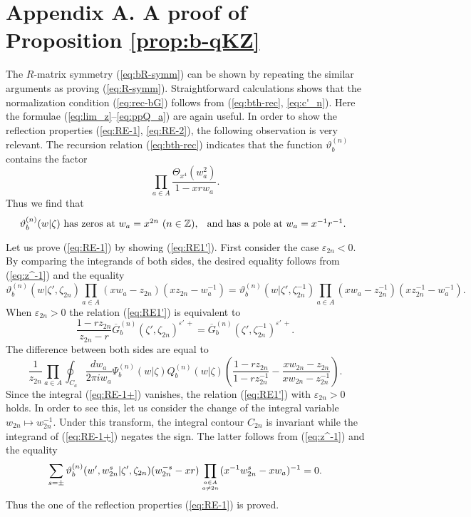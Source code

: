 \documentclass[a4paper,10pt]{article}
\begin{document}
{\appendix

\section{Appendix A. A proof of Proposition 
\ref{prop:b-qKZ}}

The $R$-matrix symmetry (\ref{eq:bR-symm}) can be 
shown by repeating the similar arguments as proving 
(\ref{eq:R-symm}). Straightforward calculations shows 
that the normalization condition (\ref{eq:rec-bG}) 
follows from (\ref{eq:bth-rec}, \ref{eq:c'_n}). 
Here the formulae (\ref{eq:lim_z}--\ref{eq:ppQ_a}) 
are again useful. In order to show the reflection 
properties (\ref{eq:RE-1}, \ref{eq:RE-2}), the following 
observation is very relevant. 
The recursion relation (\ref{eq:bth-rec}) indicates 
that the function $\vartheta^{(n)}_b$ contains the 
factor 
$$
\prod_{a\in A} \frac{\Theta_{x^4} (w_a^{2})}{1-xrw_a}. 
$$
Thus we find that 
\begin{equation}
\mbox{$\vartheta^{(n)}_b(w|\zeta )$ has zeros at $w_a =
x^{2n}$ ($n\in\mathbb{Z}$), \; and has a pole at 
$w_a =x^{-1}r^{-1}$. }
\label{eq:bth-0pole}
\end{equation}

Let us prove (\ref{eq:RE-1}) by showing (\ref{eq:RE1'}). 
First consider the case $\varepsilon_{2n}<0$. By comparing 
the integrands of both sides, the desired equality follows 
from (\ref{eq:z^-1}) and the equality 
$$
\vartheta^{(n)}_b(w|\zeta', \zeta_{2n})\prod_{a\in A} 
(xw_a -z_{2n})(xz_{2n}-w_a^{-1})=
\vartheta^{(n)}_b(w|\zeta', \zeta_{2n}^{-1})\prod_{a\in A} 
(xw_a -z_{2n}^{-1})(xz_{2n}^{-1}-w_a^{-1}). 
$$
When $\varepsilon_{2n}>0$ the relation (\ref{eq:RE1'}) 
is equivalent to 
$$
\frac{1-rz_{2n}}{z_{2n}-r}
\overline{G}_{b}^{(n)} (\zeta', \zeta_{2n})^{
\varepsilon'\,+}
=\overline{G}_{b}^{(n)} 
(\zeta',\zeta_{2n}^{-1})^{\varepsilon'\,+}. 
$$
The difference between both sides are equal to
\begin{equation}
\frac{1}{z_{2n}}\prod_{a\in A}\oint_{C_a} 
\dfrac{dw_a}{2\pi iw_a} 
\Psi_{b}^{(n)} (w|\zeta )
Q_b^{(n)}(w|\zeta)\left( 
\frac{1-rz_{2n}}{1-rz_{2n}^{-1}}-
\frac{xw_{2n}-z_{2n}}{xw_{2n}-z_{2n}^{-1}} \right). 
\label{eq:RE-1+}
\end{equation}
Since the integral (\ref{eq:RE-1+}) vanishes, 
the relation (\ref{eq:RE1'}) with $\varepsilon_{2n}>0$ 
holds. In order to see this, let us consider the change of 
the integral variable $w_{2n}\mapsto w_{2n}^{-1}$. Under 
this transform, the integral contour $C_{2n}$ is invariant 
while the integrand of (\ref{eq:RE-1+}) negates the sign. 
The latter follows from (\ref{eq:z^-1}) and the equality 
$$
\sum_{s=\pm} \vartheta^{(n)}_b 
(w',w_{2n}^s|\zeta' ,\zeta_{2n})(w_{2n}^{-s}-xr)
\prod_{a\in A\atop a\neq 2n} (x^{-1}w_{2n}^s -xw_a )^{-1}
=0. 
$$
Thus the one of the reflection properties (\ref{eq:RE-1}) 
is proved. 

}
\end{document}
